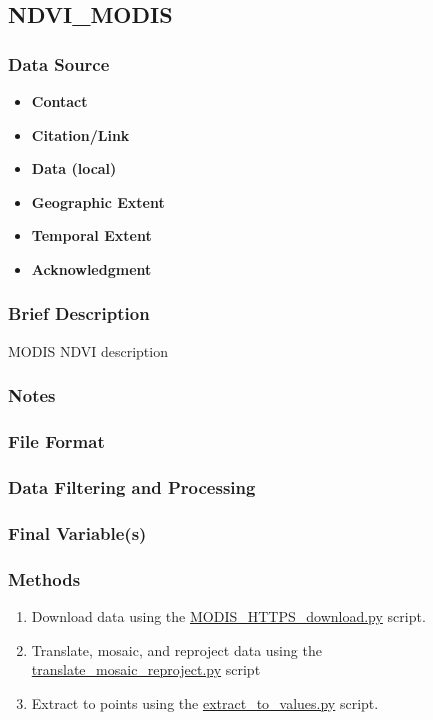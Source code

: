 \subsection{NDVI_MODIS}
\subsubsection*{Data Source}
\begin{itemize}[nolistsep]
\item \textbf{Contact}
\item \textbf{Citation/Link}
\item \textbf{Data (local)}
\item \textbf{Geographic Extent}
\item \textbf{Temporal Extent}
\item \textbf{Acknowledgment}
\end{itemize}
\subsubsection*{Brief Description}

MODIS NDVI description

\subsubsection*{Notes}
\subsubsection*{File Format}
\subsubsection*{Data Filtering and Processing}
\subsubsection*{Final Variable(s)}
\subsubsection*{Methods}
\begin{enumerate}
\item Download data using the \href{https://github.com/earthlab/estimate-pm25/blob/master/download-earth-observations/MODIS_HTTPS_download.py}{MODIS_HTTPS_download.py} script.
\item Translate, mosaic, and reproject data using the \href{https://github.com/earthlab/estimate-pm25/blob/master/download-earth-observations/MODIS_NDVI/translate_mosaic_reproject.py}{translate_mosaic_reproject.py} script
\item Extract to points using the \href{https://github.com/earthlab/estimate-pm25/blob/master/download-earth-observations/MODIS_NDVI/extract_to_values.py}{extract_to_values.py} script.
\end{enumerate}
